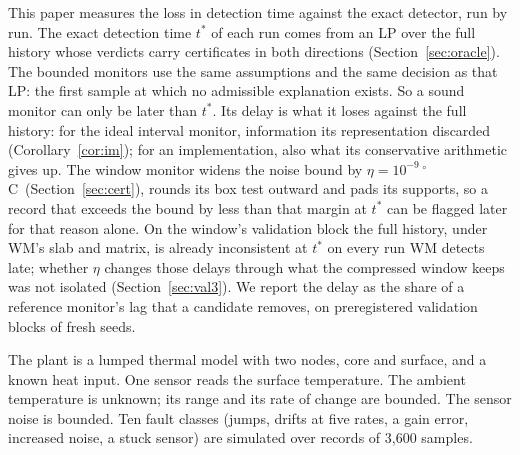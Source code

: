 \documentclass[11pt,a4paper]{article}
\newcommand{\degC}{\ensuremath{{}^\circ}C}
\newcommand{\tstar}{t^{\ast}}
\begin{document}
This paper measures the loss in detection time against the exact detector, run by run. The exact detection time
$\tstar$ of each run comes from an LP over the full history whose verdicts carry certificates in both directions
(Section~\ref{sec:oracle}). The bounded monitors use the same assumptions and the same decision as that LP: the first
sample at which no admissible explanation exists. So a sound monitor can only be later than $\tstar$. Its delay is
what it loses against the full history: for the ideal interval monitor, information its representation discarded
(Corollary~\ref{cor:im}); for an implementation, also what its conservative arithmetic gives up. The window monitor
widens the noise bound by $\eta = 10^{-9}$\,\degC\ (Section~\ref{sec:cert}), rounds its box test outward and pads
its supports, so a record that exceeds the bound by less than that margin at $\tstar$ can be flagged later for that
reason alone. On the window's validation block the full history, under WM's slab and matrix, is already
inconsistent at $\tstar$ on every run WM detects late; whether $\eta$ changes those delays through what the compressed
window keeps was not isolated (Section~\ref{sec:val3}). We report the delay as the share of a
reference monitor's lag that a candidate removes, on preregistered validation blocks of fresh seeds.

The plant is a lumped thermal model with two nodes, core and surface, and a known heat input. One sensor reads the
surface temperature. The ambient temperature is unknown; its range and its rate of change are bounded. The sensor
noise is bounded. Ten fault classes (jumps, drifts at five rates, a gain error, increased noise, a stuck sensor) are
simulated over records of 3,600 samples.
\end{document}
